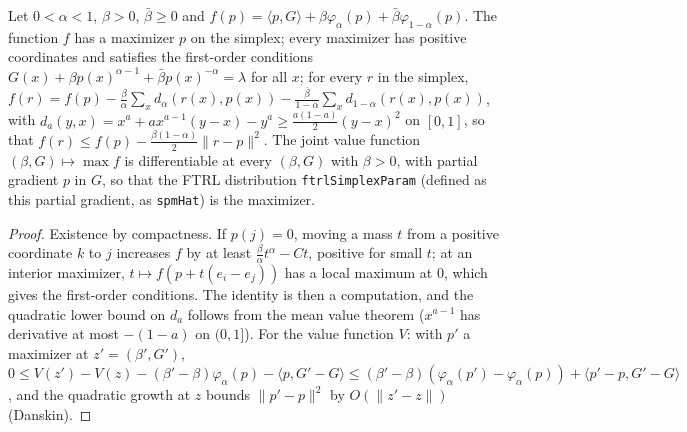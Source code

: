 \begin{lemma}
  \label{lem:hybrid_ftrl}
  \leanok
  Let $0 < \alpha < 1$, $\beta > 0$, $\bar\beta \ge 0$ and $f(p) = \langle p, G\rangle + \beta
  \varphi_\alpha(p) + \bar\beta \varphi_{1-\alpha}(p)$. The function $f$ has a maximizer $p$ on the
  simplex; every maximizer has positive coordinates and satisfies the first-order conditions $G(x)
  + \beta p(x)^{\alpha - 1} + \bar\beta p(x)^{-\alpha} = \lambda$ for all $x$; for every $r$ in
  the simplex, $f(r) = f(p) - \frac{\beta}{\alpha}\sum_x d_\alpha(r(x), p(x)) -
  \frac{\bar\beta}{1 - \alpha}\sum_x d_{1-\alpha}(r(x), p(x))$, with $d_a(y, x) = x^a + a
  x^{a-1}(y - x) - y^a \ge \frac{a(1-a)}{2}(y - x)^2$ on $[0, 1]$, so that $f(r) \le f(p) -
  \frac{\beta(1-\alpha)}{2}\|r - p\|^2$. The joint value function $(\beta, G) \mapsto \max f$ is
  differentiable at every $(\beta, G)$ with $\beta > 0$, with partial gradient $p$ in $G$, so that
  the FTRL distribution \texttt{ftrlSimplexParam} (defined as this partial gradient, as
  \texttt{spmHat}) is the maximizer.
\end{lemma}

\begin{proof}
  \leanok
  Existence by compactness. If $p(j) = 0$, moving a mass $t$ from a positive coordinate $k$ to $j$
  increases $f$ by at least $\frac{\beta}{\alpha} t^\alpha - Ct$, positive for small $t$; at an
  interior maximizer, $t \mapsto f(p + t(e_i - e_j))$ has a local maximum at $0$, which gives the
  first-order conditions. The identity is then a computation, and the quadratic lower bound on
  $d_a$ follows from the mean value theorem ($x^{a-1}$ has derivative at most $-(1-a)$ on
  $(0, 1]$). For the value function $V$: with $p'$ a maximizer at $z' = (\beta', G')$,
  $0 \le V(z') - V(z) - (\beta' - \beta)\varphi_\alpha(p) - \langle p, G' - G\rangle \le
  (\beta' - \beta)(\varphi_\alpha(p') - \varphi_\alpha(p)) + \langle p' - p, G' - G\rangle$, and
  the quadratic growth at $z$ bounds $\|p' - p\|^2$ by $O(\|z' - z\|)$ (Danskin).
\end{proof}

